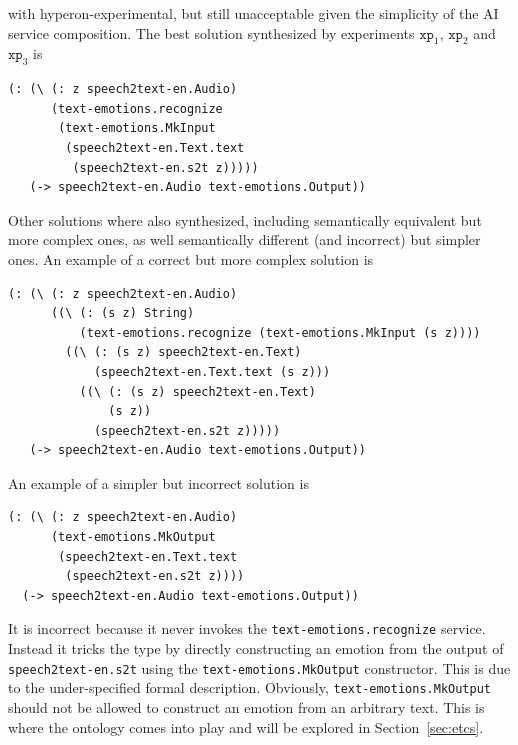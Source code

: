\documentclass[]{report}
\begin{document}
with hyperon-experimental, but still unacceptable given the simplicity
of the AI service composition.  The best solution synthesized by
experiments $\texttt{xp}_1$, $\texttt{xp}_2$ and $\texttt{xp}_3$ is
\begin{verbatim}
(: (\ (: z speech2text-en.Audio)
      (text-emotions.recognize
       (text-emotions.MkInput
        (speech2text-en.Text.text
         (speech2text-en.s2t z)))))
   (-> speech2text-en.Audio text-emotions.Output))
\end{verbatim}
Other solutions where also synthesized, including semantically
equivalent but more complex ones, as well semantically different (and
incorrect) but simpler ones.  An example of a correct but more complex
solution is
\begin{verbatim}
(: (\ (: z speech2text-en.Audio)
      ((\ (: (s z) String)
          (text-emotions.recognize (text-emotions.MkInput (s z))))
        ((\ (: (s z) speech2text-en.Text)
            (speech2text-en.Text.text (s z)))
          ((\ (: (s z) speech2text-en.Text)
              (s z))
            (speech2text-en.s2t z)))))
   (-> speech2text-en.Audio text-emotions.Output))
\end{verbatim}
An example of a simpler but incorrect solution is
\begin{verbatim}
(: (\ (: z speech2text-en.Audio)
      (text-emotions.MkOutput
       (speech2text-en.Text.text
        (speech2text-en.s2t z))))
  (-> speech2text-en.Audio text-emotions.Output))
\end{verbatim}
It is incorrect because it never invokes the
\texttt{text-emotions.recognize} service.  Instead it
tricks the type by directly constructing an emotion from the output of
\texttt{speech2text-en.s2t} using the
\texttt{text-emotions.MkOutput} constructor.  This is due
to the under-specified formal description.  Obviously,
\texttt{text-emotions.MkOutput} should not be allowed to
construct an emotion from an arbitrary text.  This is where the
ontology comes into play and will be explored in
Section~\ref{sec:etcs}.
\end{document}
